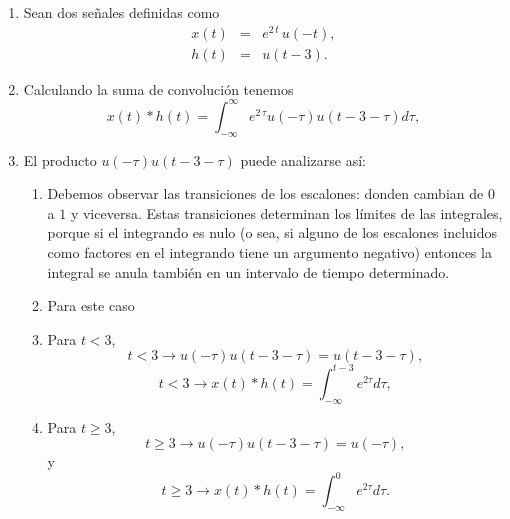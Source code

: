 \begin{enumerate}

\item Sean dos se\~{n}ales definidas como
\begin{eqnarray}
        x\left( t\right) &=& e^{2 \, t} \, u\left( -t\right) ,  \\
        h\left( t\right) &=& u\left( t-3\right).
\end{eqnarray}

\item Calculando la suma de convolución tenemos
\begin{equation}
        x\left( t\right) * h\left( t\right) = 
        \int_{-\infty }^{\infty}e^{2 \, \tau} u\left( - \tau\right) u\left( t-3-\tau \right) d\tau ,
\end{equation}

\item El producto $u\left( -\tau\right) u\left( t-3-\tau \right)$ puede analizarse así:
\begin{enumerate}
\item Debemos observar las transiciones de los escalones: donden cambian de $0$ a $1$ y viceversa. Estas
transiciones determinan los límites de las integrales, porque si el integrando es nulo (o sea, si 
alguno de los escalones incluidos como factores en el integrando tiene un argumento negativo) entonces
la integral se anula también en un intervalo de tiempo determinado.
\item Para este caso
\item Para $t < 3$,
\begin{equation}
        t < 3   \rightarrow  u\left( -\tau\right) u\left( t-3-\tau \right) = 
        u\left( t-3-\tau \right),
\end{equation}
\begin{equation}
        t<3 \rightarrow x\left( t\right) * h\left( t\right) = \int_{-\infty}^{t-3}e^{2\tau}d\tau ,
\end{equation}

\item Para $t \geq 3$,
\begin{equation}
        t \geq 3        \rightarrow  u\left( -\tau\right) u\left( t-3-\tau \right) = 
        u\left( -\tau \right),
\end{equation}
y
\begin{equation}
        t\geq 3 \rightarrow x\left( t\right) * h\left( t\right) = \int_{-\infty}^{0}e^{2\tau}d\tau .
\end{equation}
\end{enumerate}
\end{enumerate}

